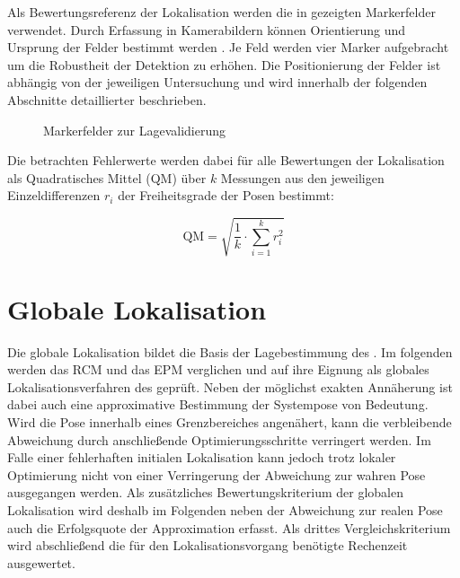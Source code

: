 Als Bewertungsreferenz der Lokalisation werden die in  gezeigten Markerfelder verwendet. Durch Erfassung in Kamerabildern können Orientierung und Ursprung der Felder bestimmt werden \cite{arsys}. Je Feld werden vier Marker aufgebracht um die Robustheit der Detektion zu erhöhen. Die Positionierung der Felder ist abhängig von der jeweiligen Untersuchung und wird innerhalb der folgenden Abschnitte detaillierter beschrieben.\\

\begin{figure}[!ht]
	\begin{center}
	
	\hspace{5mm}
	\caption{Markerfelder zur Lagevalidierung}
	\label{fig.armarker}
	\end{center}
\end{figure}

Die betrachten Fehlerwerte werden dabei für alle Bewertungen der Lokalisation als Quadratisches Mittel (QM) über $k$ Messungen aus den jeweiligen Einzeldifferenzen $r_i$ der Freiheitsgrade der Posen bestimmt:

\begin{equation}
\mathrm{QM} = \sqrt{\frac{1}{k} \cdot \sum_{i=1}^kr_i^2}
\end{equation}



\section{Globale Lokalisation}
Die globale Lokalisation bildet die Basis der Lagebestimmung des . Im folgenden werden das RCM und das EPM verglichen und auf ihre Eignung als globales Lokalisationsverfahren des  geprüft. Neben der möglichst exakten Annäherung ist dabei auch eine approximative Bestimmung der Systempose von Bedeutung. Wird die Pose innerhalb eines Grenzbereiches angenähert, kann die verbleibende Abweichung durch anschließende Optimierungsschritte verringert werden. Im Falle einer fehlerhaften initialen Lokalisation kann jedoch trotz lokaler Optimierung nicht von einer Verringerung der Abweichung zur wahren Pose ausgegangen werden. Als zusätzliches Bewertungskriterium der globalen Lokalisation wird deshalb im Folgenden neben der Abweichung zur realen Pose auch die Erfolgsquote der Approximation erfasst. Als drittes Vergleichskriterium wird abschließend die für den Lokalisationsvorgang benötigte Rechenzeit ausgewertet.\\

